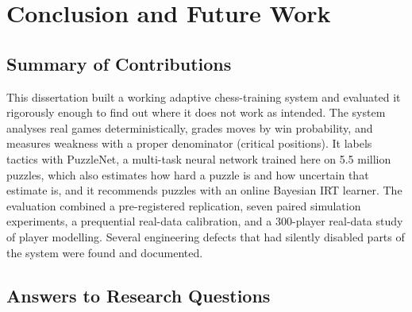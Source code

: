 \chapter{Conclusion and Future Work}\label{ch:conclusion}

\section{Summary of Contributions}

This dissertation built a working adaptive chess-training system and evaluated it rigorously enough to
find out where it does not work as intended. The system analyses real games deterministically, grades
moves by win probability, and measures weakness with a proper denominator (critical positions). It
labels tactics with PuzzleNet, a multi-task neural network trained here on 5.5 million puzzles, which
also estimates how hard a puzzle is and how uncertain that estimate is, and it recommends puzzles with
an online Bayesian IRT learner. The evaluation combined a pre-registered replication, seven paired simulation experiments, a
prequential real-data calibration, and a 300-player real-data study of player modelling. Several
engineering defects that had silently disabled parts of the system were found and documented.

\section{Answers to Research Questions}\label{sec:answers}

